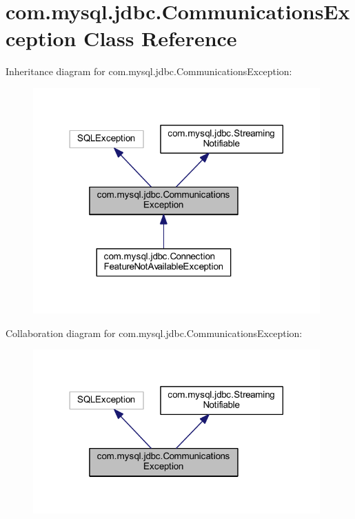 \hypertarget{classcom_1_1mysql_1_1jdbc_1_1_communications_exception}{}\section{com.\+mysql.\+jdbc.\+Communications\+Exception Class Reference}
\label{classcom_1_1mysql_1_1jdbc_1_1_communications_exception}


Inheritance diagram for com.\+mysql.\+jdbc.\+Communications\+Exception\+:\nopagebreak
\begin{figure}[H]
\begin{center}
\leavevmode
\includegraphics[width=312pt]{classcom_1_1mysql_1_1jdbc_1_1_communications_exception__inherit__graph}
\end{center}
\end{figure}


Collaboration diagram for com.\+mysql.\+jdbc.\+Communications\+Exception\+:\nopagebreak
\begin{figure}[H]
\begin{center}
\leavevmode
\includegraphics[width=312pt]{classcom_1_1mysql_1_1jdbc_1_1_communications_exception__coll__graph}
\end{center}
\end{figure}
